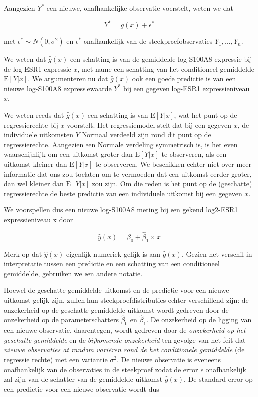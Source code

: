 \documentclass[
  12pt,dutch]{book}
\theoremstyle{definition}
\theoremstyle{definition}
\theoremstyle{definition}
\theoremstyle{definition}
\theoremstyle{remark}
\begin{document}
Aangezien \(Y^*\) een nieuwe, onafhankelijke observatie voorstelt, weten we dat

\[
  Y^* = g(x) + \epsilon^*
\]

met \(\epsilon^*\sim N(0,\sigma^2)\) en \(\epsilon^*\) onafhankelijk van de steekproefobservaties \(Y_1,\ldots, Y_n\).

We weten dat \(\hat{g}(x)\) een schatting is van de gemiddelde log-S100A8 expressie bij de log-ESR1 expressie \(x\), met name een schatting van het conditioneel gemiddelde \(\text{E}[Y\vert x]\). We argumenteren nu dat \(\hat{g}(x)\) ook een goede predictie is van een nieuwe log-S100A8 expressiewaarde \(Y^*\) bij een gegeven log-ESR1 expressieniveau \(x\).

We weten reeds dat \(\hat{g}(x)\) een schatting is van \(\text{E}[Y\vert x]\), wat het punt op de regressierechte bij \(x\) voorstelt. Het regressiemodel stelt dat bij een gegeven \(x\), de individuele uitkomsten \(Y\) Normaal verdeeld zijn rond dit punt op de regressierechte. Aangezien een Normale verdeling symmetrisch is, is het even waarschijnlijk om een uitkomst groter dan \(\text{E}[Y\vert x]\) te observeren, als een uitkomst kleiner dan \(\text{E}[Y\vert x]\) te observeren. We beschikken echter niet over meer informatie dat ons zou toelaten om te vermoeden dat een uitkomst eerder groter, dan wel kleiner dan \(\text{E}[Y\vert x]\) zou zijn. Om die reden is het punt op de (geschatte) regressierechte de beste predictie van een individuele uitkomst bij een gegeven \(x\).

We voorspellen dus een nieuwe log-S100A8 meting bij een gekend log2-ESR1 expressieniveau x door

\[
  \hat{y}(x)=\hat{\beta}_0+\hat{\beta}_1 \times x
\]

Merk op dat \(\hat{y}(x)\) eigenlijk numeriek gelijk is aan \(\hat{g}(x)\). Gezien het verschil in interpretatie tussen een predictie en een schatting van een conditioneel gemiddelde, gebruiken we een andere notatie.

Hoewel de geschatte gemiddelde uitkomst en de predictie voor een nieuwe uitkomst gelijk zijn, zullen hun steekproefdistributies echter verschillend zijn:
de onzekerheid op de geschatte gemiddelde uitkomst wordt gedreven door de onzekerheid op de parameterschatters \(\hat\beta_0\) en \(\hat\beta_1\). De onzekerheid op de ligging van een nieuwe observatie, daarentegen, wordt gedreven door de \emph{onzekerheid op het geschatte gemiddelde} en de \emph{bijkomende onzekerheid} ten gevolge van het feit dat \emph{nieuwe observaties at random variëren rond de het conditionele gemiddelde} (de regressie rechte) met een variantie \(\sigma^2\). De nieuwe observatie is eveneens onafhankelijk van de observaties in de steekproef zodat de error \(\epsilon\) onafhankelijk zal zijn van de schatter van de gemiddelde uitkomst \(\hat{g}(x)\). De standard error op een predictie voor een nieuwe observatie wordt dus
\end{document}
